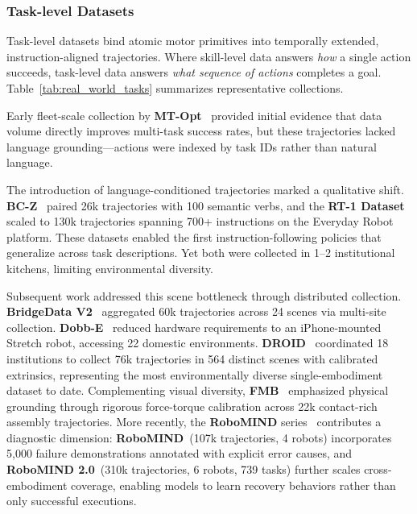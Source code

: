 \documentclass[acmsmall,screen,review,anonymous]{acmart}
\begin{document}
\subsubsection{Task-level Datasets}\label{sec:task_datasets_narrative}

Task-level datasets bind atomic motor primitives into temporally extended, instruction-aligned trajectories. Where skill-level data answers \emph{how} a single action succeeds, task-level data answers \emph{what sequence of actions} completes a goal. Table~\ref{tab:real_world_tasks} summarizes representative collections.

Early fleet-scale collection by \textbf{MT-Opt}~\cite{kalashnikov2021mt} provided initial evidence that data volume directly improves multi-task success rates, but these trajectories lacked language grounding---actions were indexed by task IDs rather than natural language.

The introduction of language-conditioned trajectories marked a qualitative shift. \textbf{BC-Z}~\cite{jang2022bc} paired 26k trajectories with 100 semantic verbs, and the \textbf{RT-1 Dataset}~\cite{brohan2023rt1} scaled to 130k trajectories spanning 700+ instructions on the Everyday Robot platform. These datasets enabled the first instruction-following policies that generalize across task descriptions. Yet both were collected in 1--2 institutional kitchens, limiting environmental diversity.

Subsequent work addressed this scene bottleneck through distributed collection. \textbf{BridgeData V2}~\cite{walke2024bridgedatav2} aggregated 60k trajectories across 24 scenes via multi-site collection. \textbf{Dobb-E}~\cite{shafiullah2023bringing} reduced hardware requirements to an iPhone-mounted Stretch robot, accessing 22 domestic environments. \textbf{DROID}~\cite{khazatsky2024droid} coordinated 18 institutions to collect 76k trajectories in 564 distinct scenes with calibrated extrinsics, representing the most environmentally diverse single-embodiment dataset to date. Complementing visual diversity, \textbf{FMB}~\cite{fu2025fmb} emphasized physical grounding through rigorous force-torque calibration across 22k contact-rich assembly trajectories. More recently, the \textbf{RoboMIND} series~\cite{wu2025robomind, hou2026robomind20} contributes a diagnostic dimension: \textbf{RoboMIND}~(107k trajectories, 4 robots) incorporates 5,000 failure demonstrations annotated with explicit error causes, and \textbf{RoboMIND 2.0}~(310k trajectories, 6 robots, 739 tasks) further scales cross-embodiment coverage, enabling models to learn recovery behaviors rather than only successful executions.
\end{document}
